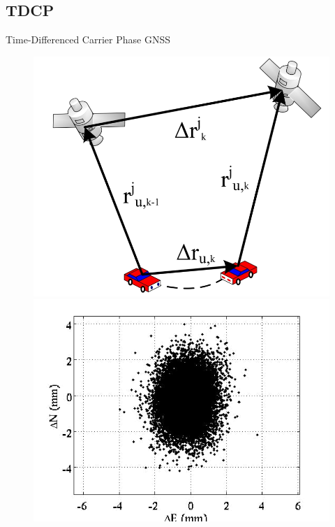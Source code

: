 \documentclass{beamer}
\begin{document}
  \subsection{TDCP}

    \begin{frame}{Time-Differenced Carrier Phase GNSS}
      \begin{figure}[ht] \centering
        \begin{minipage}[b]{0.45\linewidth}
          \includegraphics[width=\textwidth]{../graphics/tdcp_diagram.png}
          \caption{}
        \end{minipage}
        \begin{minipage}[b]{0.5\linewidth}
          \includegraphics[width=\textwidth]{../graphics/tdcp_errors.png}

\end{minipage}
\end{figure}
\end{frame}
\end{document}
